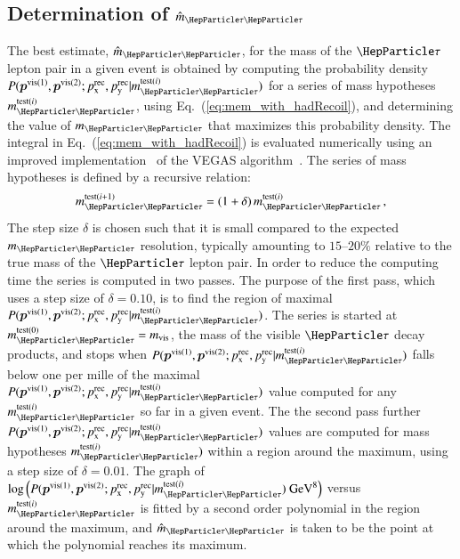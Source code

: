 \subsection{Determination of $\hat{m}_{\Pgt\Pgt}$}
\label{sec:mem_numericalMaximization}

The best estimate, $\hat{m}_{\Pgt\Pgt}$, for the mass of the $\Pgt$ lepton pair in a given event
is obtained by computing the probability density $P(\bm{p}^{\vis(1)},\bm{p}^{\vis(2)};\pX^{\rec},\pY^{\rec}|m_{\Pgt\Pgt}^{\textrm{test}(i)})$ 
for a series of mass hypotheses $m_{\Pgt\Pgt}^{\textrm{test}(i)}$, using Eq.~(\ref{eq:mem_with_hadRecoil}), and determining the value of $m_{\Pgt\Pgt}$ that maximizes this probability density.
The integral in Eq.~(\ref{eq:mem_with_hadRecoil}) is evaluated numerically
using an improved implementation~\cite{VAMP} of the VEGAS algorithm~\cite{VEGAS}.
The series of mass hypotheses is defined by a recursive relation: 
\begin{equation}
m_{\Pgt\Pgt}^{\textrm{test}(i + 1)} = (1 + \delta) \,  m_{\Pgt\Pgt}^{\textrm{test}(i)} \, ,
\label{eq:mTauTau_step_size}
\end{equation}
The step size $\delta$ is chosen such that it is small compared to the expected $m_{\Pgt\Pgt}$ resolution,
typically amounting to $15$--$20\%$ relative to the true mass of the $\Pgt$ lepton pair.
In order to reduce the computing time the series is computed in two passes.
The purpose of the first pass, which uses a step size of $\delta = 0.10$, is to find the region of maximal $P(\bm{p}^{\vis(1)},\bm{p}^{\vis(2)};\pX^{\rec},\pY^{\rec}|m_{\Pgt\Pgt}^{\textrm{test}(i)})$.
The series is started at $m_{\Pgt\Pgt}^{\textrm{test}(0)} = m_{\vis}$,
the mass of the visible $\Pgt$ decay products, 
and stops when $P(\bm{p}^{\vis(1)},\bm{p}^{\vis(2)};\pX^{\rec},\pY^{\rec}|m_{\Pgt\Pgt}^{\textrm{test}(i)})$ falls below one per mille of the maximal $P(\bm{p}^{\vis(1)},\bm{p}^{\vis(2)};\pX^{\rec},\pY^{\rec}|m_{\Pgt\Pgt}^{\textrm{test}(i)})$ value
computed for any $m_{\Pgt\Pgt}^{\textrm{test}(i)}$ so far in a given event.
The the second pass further $P(\bm{p}^{\vis(1)},\bm{p}^{\vis(2)};\pX^{\rec},\pY^{\rec}|m_{\Pgt\Pgt}^{\textrm{test}(i)})$ values are computed for mass hypotheses $m_{\Pgt\Pgt}^{\textrm{test}(i)})$ within a region around the maximum,
using a step size of $\delta = 0.01$.
The graph of $\log \left( P(\bm{p}^{\vis(1)},\bm{p}^{\vis(2)};\pX^{\rec},\pY^{\rec}|m_{\Pgt\Pgt}^{\textrm{test}(i)}) \mbox{~GeV}^{8} \right)$ versus $m_{\Pgt\Pgt}^{\textrm{test}(i)}$ is fitted by a second order polynomial
in the region around the maximum,
and $\hat{m}_{\Pgt\Pgt}$ is taken to be the point at which the polynomial reaches its maximum.
